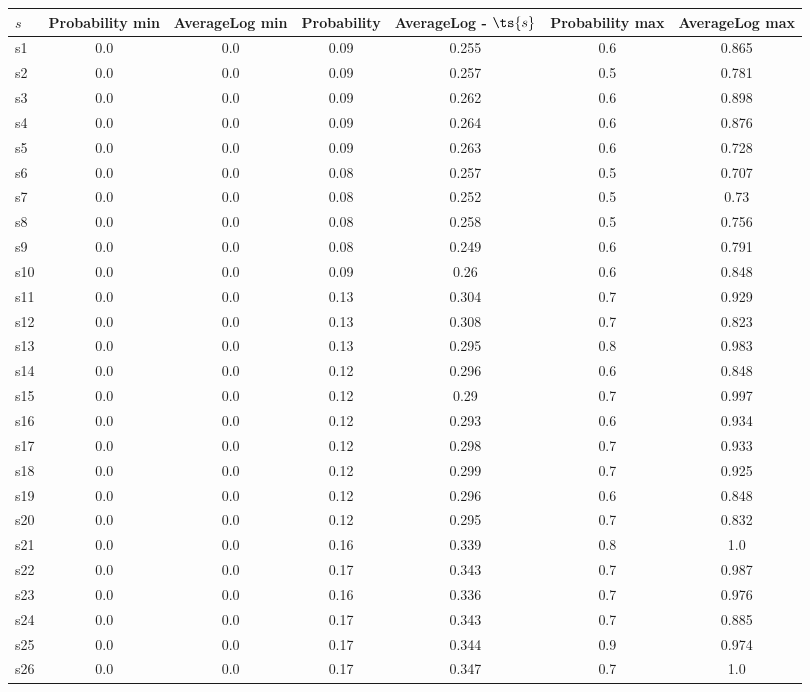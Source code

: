 \documentclass{article}
\begin{document}
\noindent\begin{tabular}{|l|c|c|c|c|c|c|}
\hline
$s$& Probability min & AverageLog min & Probability & AverageLog - $\ts{s}$ & Probability max & AverageLog max\\
\hline
s1 &0.0 & 0.0 & 0.09 & 0.255 & 0.6 & 0.865\\
\hline
s2 &0.0 & 0.0 & 0.09 & 0.257 & 0.5 & 0.781\\
\hline
s3 &0.0 & 0.0 & 0.09 & 0.262 & 0.6 & 0.898\\
\hline
s4 &0.0 & 0.0 & 0.09 & 0.264 & 0.6 & 0.876\\
\hline
s5 &0.0 & 0.0 & 0.09 & 0.263 & 0.6 & 0.728\\
\hline
s6 &0.0 & 0.0 & 0.08 & 0.257 & 0.5 & 0.707\\
\hline
s7 &0.0 & 0.0 & 0.08 & 0.252 & 0.5 & 0.73\\
\hline
s8 &0.0 & 0.0 & 0.08 & 0.258 & 0.5 & 0.756\\
\hline
s9 &0.0 & 0.0 & 0.08 & 0.249 & 0.6 & 0.791\\
\hline
s10 &0.0 & 0.0 & 0.09 & 0.26 & 0.6 & 0.848\\
\hline
s11 &0.0 & 0.0 & 0.13 & 0.304 & 0.7 & 0.929\\
\hline
s12 &0.0 & 0.0 & 0.13 & 0.308 & 0.7 & 0.823\\
\hline
s13 &0.0 & 0.0 & 0.13 & 0.295 & 0.8 & 0.983\\
\hline
s14 &0.0 & 0.0 & 0.12 & 0.296 & 0.6 & 0.848\\
\hline
s15 &0.0 & 0.0 & 0.12 & 0.29 & 0.7 & 0.997\\
\hline
s16 &0.0 & 0.0 & 0.12 & 0.293 & 0.6 & 0.934\\
\hline
s17 &0.0 & 0.0 & 0.12 & 0.298 & 0.7 & 0.933\\
\hline
s18 &0.0 & 0.0 & 0.12 & 0.299 & 0.7 & 0.925\\
\hline
s19 &0.0 & 0.0 & 0.12 & 0.296 & 0.6 & 0.848\\
\hline
s20 &0.0 & 0.0 & 0.12 & 0.295 & 0.7 & 0.832\\
\hline
s21 &0.0 & 0.0 & 0.16 & 0.339 & 0.8 & 1.0\\
\hline
s22 &0.0 & 0.0 & 0.17 & 0.343 & 0.7 & 0.987\\
\hline
s23 &0.0 & 0.0 & 0.16 & 0.336 & 0.7 & 0.976\\
\hline
s24 &0.0 & 0.0 & 0.17 & 0.343 & 0.7 & 0.885\\
\hline
s25 &0.0 & 0.0 & 0.17 & 0.344 & 0.9 & 0.974\\
\hline
s26 &0.0 & 0.0 & 0.17 & 0.347 & 0.7 & 1.0\\

\end{tabular}
\end{document}
